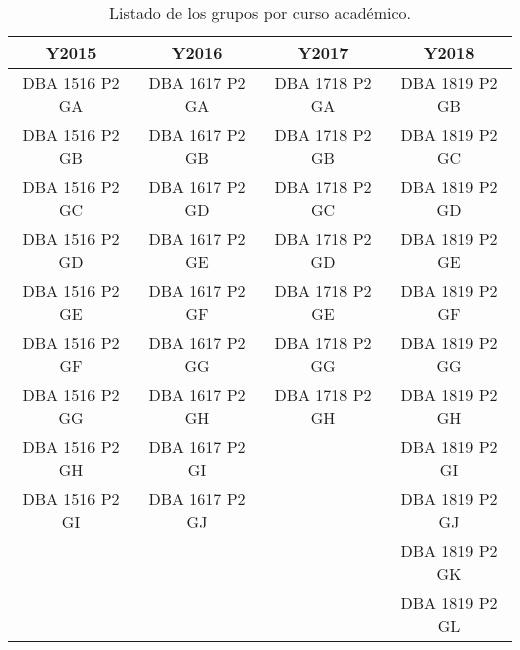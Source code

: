 \begin{table}[H]
\centering
\caption{Listado de los grupos por curso académico.}
\label{tab:groups1}
\begin{tabular}{cccc}
\hline
\textbf{Y2015} & \textbf{Y2016} & \textbf{Y2017} & \textbf{Y2018} \\ \hline
DBA 1516 P2 GA & DBA 1617 P2 GA & DBA 1718 P2 GA & DBA 1819 P2 GB \\
DBA 1516 P2 GB & DBA 1617 P2 GB & DBA 1718 P2 GB & DBA 1819 P2 GC \\
DBA 1516 P2 GC & DBA 1617 P2 GD & DBA 1718 P2 GC & DBA 1819 P2 GD \\
DBA 1516 P2 GD & DBA 1617 P2 GE & DBA 1718 P2 GD & DBA 1819 P2 GE \\
DBA 1516 P2 GE & DBA 1617 P2 GF & DBA 1718 P2 GE & DBA 1819 P2 GF \\
DBA 1516 P2 GF & DBA 1617 P2 GG & DBA 1718 P2 GG & DBA 1819 P2 GG \\
DBA 1516 P2 GG & DBA 1617 P2 GH & DBA 1718 P2 GH & DBA 1819 P2 GH \\
DBA 1516 P2 GH & DBA 1617 P2 GI & 				 & DBA 1819 P2 GI \\
DBA 1516 P2 GI & DBA 1617 P2 GJ & 				 & DBA 1819 P2 GJ \\
			   &				&			     & DBA 1819 P2 GK \\
			   &				&				 & DBA 1819 P2 GL \\ \hline
\end{tabular}
\end{table}

